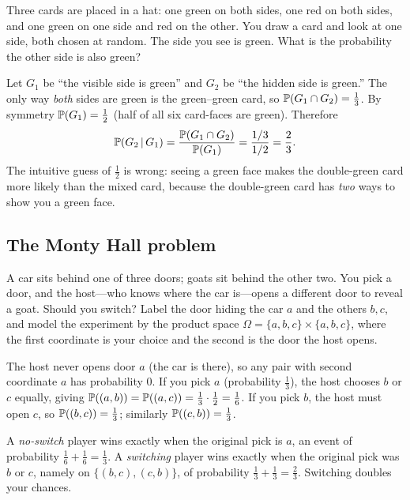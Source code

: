 \begin{example}
Three cards are placed in a hat: one green on both sides, one red on both sides,
and one green on one side and red on the other. You draw a card and look at one
side, both chosen at random. The side you see is green. What is the probability
the other side is also green?

\solution Let $G_1$ be ``the visible side is green'' and $G_2$ be ``the hidden
side is green.'' The only way \emph{both} sides are green is the green--green
card, so $\mathbb{P}(G_1\cap G_2)=\tfrac13$. By symmetry $\mathbb{P}(G_1)=\tfrac12$ (half
of all six card-faces are green). Therefore
\[
  \mathbb{P}(G_2\,|\, G_1)=\frac{\mathbb{P}(G_1\cap G_2)}{\mathbb{P}(G_1)}
   =\frac{1/3}{1/2}=\frac{2}{3}.
\]
The intuitive guess of $\tfrac12$ is wrong: seeing a green face makes the
double-green card more likely than the mixed card, because the double-green card
has \emph{two} ways to show you a green face.
\end{example}

\subsection{The Monty Hall problem}

\begin{example}
A car sits behind one of three doors; goats sit behind the other two. You pick a
door, and the host—who knows where the car is—opens a different door to reveal a
goat. Should you switch? Label the door hiding the car $a$ and the others $b,c$,
and model the experiment by the product space $\Omega=\{a,b,c\}\times\{a,b,c\}$,
where the first coordinate is your choice and the second is the door the host
opens.

\solution The host never opens door $a$ (the car is there), so any pair with
second coordinate $a$ has probability $0$. If you pick $a$ (probability
$\tfrac13$), the host chooses $b$ or $c$ equally, giving
$\mathbb{P}((a,b))=\mathbb{P}((a,c))=\tfrac13\cdot\tfrac12=\tfrac16$. If you pick $b$, the
host must open $c$, so $\mathbb{P}((b,c))=\tfrac13$; similarly $\mathbb{P}((c,b))=\tfrac13$.

A \emph{no-switch} player wins exactly when the original pick is $a$, an event of
probability $\tfrac16+\tfrac16=\tfrac13$. A \emph{switching} player wins exactly
when the original pick was $b$ or $c$, namely on $\{(b,c),(c,b)\}$, of
probability $\tfrac13+\tfrac13=\tfrac23$. Switching doubles your chances.
\end{example}

